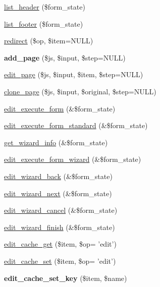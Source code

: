 \begin{DoxyCompactItemize}
\item 
\hyperlink{classctools__export__ui_a08067ac459551d06772d81673801f023}{list\_\-header} (\$form\_\-state)
\item 
\hyperlink{classctools__export__ui_a80ba17871c5fd3bbb886ee58f330ae55}{list\_\-footer} (\$form\_\-state)
\item 
\hyperlink{classctools__export__ui_a0265326b637899471198d0b7c260701d}{redirect} (\$op, \$item=NULL)
\item 
\hypertarget{classctools__export__ui_ad07171217eac84b1a967ea07ab20139a}{
{\bfseries add\_\-page} (\$js, \$input, \$step=NULL)}
\label{classctools__export__ui_ad07171217eac84b1a967ea07ab20139a}

\item 
\hyperlink{classctools__export__ui_a150ff1f0729f0a9313119dc528bbd9fc}{edit\_\-page} (\$js, \$input, \$item, \$step=NULL)
\item 
\hyperlink{classctools__export__ui_a20bcb4d94dd7450de286084cd3dd6e99}{clone\_\-page} (\$js, \$input, \$original, \$step=NULL)
\item 
\hyperlink{classctools__export__ui_a211541eb41cf4817f0912b27f7c7762c}{edit\_\-execute\_\-form} (\&\$form\_\-state)
\item 
\hyperlink{classctools__export__ui_af84dd7b0d7b101b9e675b77015922e90}{edit\_\-execute\_\-form\_\-standard} (\&\$form\_\-state)
\item 
\hyperlink{classctools__export__ui_a6cd4e76e5a3e84c8bf427641e2de7c0d}{get\_\-wizard\_\-info} (\&\$form\_\-state)
\item 
\hyperlink{classctools__export__ui_a1148521266892c63324c1a72ea70f71d}{edit\_\-execute\_\-form\_\-wizard} (\&\$form\_\-state)
\item 
\hyperlink{classctools__export__ui_a9e27991486cb30aa689eb12d215bb22b}{edit\_\-wizard\_\-back} (\&\$form\_\-state)
\item 
\hyperlink{classctools__export__ui_abe09a0604f2423fbb210e09b0e6273bd}{edit\_\-wizard\_\-next} (\&\$form\_\-state)
\item 
\hyperlink{classctools__export__ui_adbc6c75b9c635e07f1ef82b0ba25e932}{edit\_\-wizard\_\-cancel} (\&\$form\_\-state)
\item 
\hyperlink{classctools__export__ui_a997d5570604880f989d5aaebd2f6fe29}{edit\_\-wizard\_\-finish} (\&\$form\_\-state)
\item 
\hyperlink{classctools__export__ui_a04faa907c3f7c0823c44221c5bf40ad8}{edit\_\-cache\_\-get} (\$item, \$op= 'edit')
\item 
\hyperlink{classctools__export__ui_a6c51164bf094804268b78151c49b6b89}{edit\_\-cache\_\-set} (\$item, \$op= 'edit')
\item 
\hypertarget{classctools__export__ui_aa459ee48b2618762ee91cd046667053d}{
{\bfseries edit\_\-cache\_\-set\_\-key} (\$item, \$name)}
\label{classctools__export__ui_aa459ee48b2618762ee91cd046667053d}


\end{DoxyCompactItemize}

